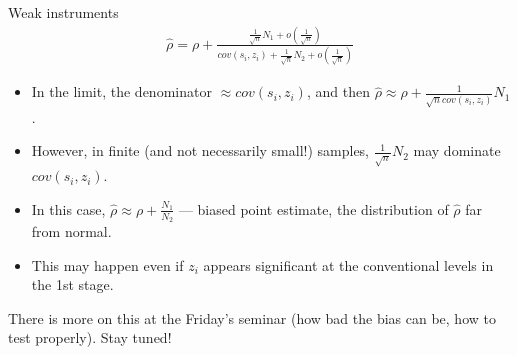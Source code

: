\documentclass[pdftex]{beamer}
\begin{document}
\begin{frame}{Weak instruments}
	\begin{align*}
		\widehat\rho=\rho + \frac{\frac{1}{\sqrt{n}}N_1 + o\left(\frac{1}{\sqrt{n}}\right)}
		{cov(s_i, z_i) + \frac{1}{\sqrt{n}}N_2 + o\left(\frac{1}{\sqrt{n}}\right)}
	\end{align*}

	\begin{itemize}
	 	\item In the limit, the denominator $\approx cov(s_i, z_i)$, and then $\widehat\rho\approx\rho + \frac{1}{\sqrt{n}cov(s_i, z_i)}N_1$.
	 	\item However, in finite (and not necessarily small!) samples, $\frac{1}{\sqrt{n}}N_2$ may dominate $cov(s_i, z_i)$. 
	 	\item In this case, $\widehat\rho \approx \rho + \frac{N_1}{N_2}$ --- biased point estimate, the distribution of $\widehat\rho$ far from normal.
	 	\item This may happen even if $z_i$ appears significant at the conventional levels in the 1st stage.
	 \end{itemize}
	There is more on this at the Friday's seminar (how bad the bias can be, how to test properly). Stay tuned!
\end{frame}

\end{document}
